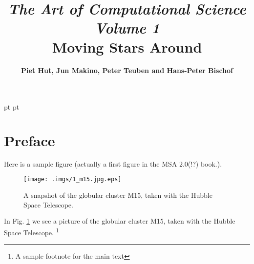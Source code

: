 \documentclass{book}
\begin{document}
 pt
 pt



\title{{\sl \huge The Art of Computational Science}\\
\bigskip
{\sl Volume 1}\\
\bigskip
\bigskip
\bigskip
\bigskip
\bigskip
\bf Moving Stars Around
\bigskip
}
\author{\bf Piet Hut, Jun Makino, Peter Teuben and Hans-Peter Bischof}


\maketitle
\thispagestyle{empty}


\newpage\tableofcontents\newpage


\chapter*{  Preface}
\label{sect:1}

Here is a sample figure (actually a first figure in the MSA 2.0(!?)
book.).

\begin{figure}
\begin{center}
    \texttt{[image: .imgs/1\_m15.jpg.eps]}
\caption{ A snapshot of the globular cluster M15, taken with the Hubble Space
 Telescope.
\protect\footnotemark[42]
}
\label{m15}
\end{center}
\end{figure}

In Fig. \ref{m15} we see a
picture of the globular cluster M15, taken with the Hubble Space
Telescope. \footnote[42]{A sample footnote for the main text}
\end{document}
